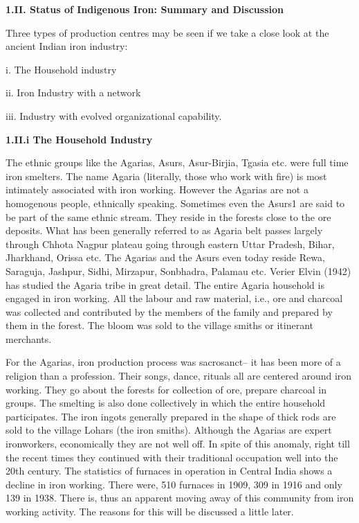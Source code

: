 \textbf{1.II. Status of Indigenous Iron: Summary and Discussion}

Three types of production centres may be seen if we take a close look at the ancient Indian iron industry:

i. The Household industry

ii. Iron Industry with a network

iii. Industry with evolved organizational capability.

\textbf{1.II.i The Household Industry}

The ethnic groups like the Agarias, Asurs, Asur-Birjia, Tgasia etc. were full time iron smelters. The name Agaria (literally, those who work with fire) is most intimately associated with iron working. However the Agarias are not a homogenous people, ethnically speaking. Sometimes even the Asurs1 are said to be part of the same ethnic stream. They reside in the forests close to the ore deposits. What has been generally referred to as Agaria belt passes largely through Chhota Nagpur plateau going through eastern Uttar Pradesh, Bihar, Jharkhand, Orissa etc. The Agarias and the Asurs even today reside Rewa, Saraguja, Jashpur, Sidhi, Mirzapur, Sonbhadra, Palamau etc. Verier Elvin (1942) has studied the Agaria tribe in great detail. The entire Agaria household is engaged in iron working. All the labour and raw material, i.e., ore and charcoal was collected and contributed by the members of the family and prepared by them in the forest. The bloom was sold to the village smiths or itinerant merchants.

For the Agarias, iron production process was sacrosanct– it has been more of a religion than a profession. Their songs, dance, rituals all are centered around iron working. They go about the forests for collection of ore, prepare charcoal in groups. The smelting is also done collectively in which the entire household participates. The iron ingots generally prepared in the shape of thick rods are sold to the village Lohars (the iron smiths). Although the Agarias are expert ironworkers, economically they are not well off. In spite of this anomaly, right till the recent times they continued with their traditional occupation well into the 20th century. The statistics of furnaces in operation in Central India shows a decline in iron working. There were, 510 furnaces in 1909, 309 in 1916 and only 139 in 1938. There is, thus an apparent moving away of this community from iron working activity. The reasons for this will be discussed a little later.

